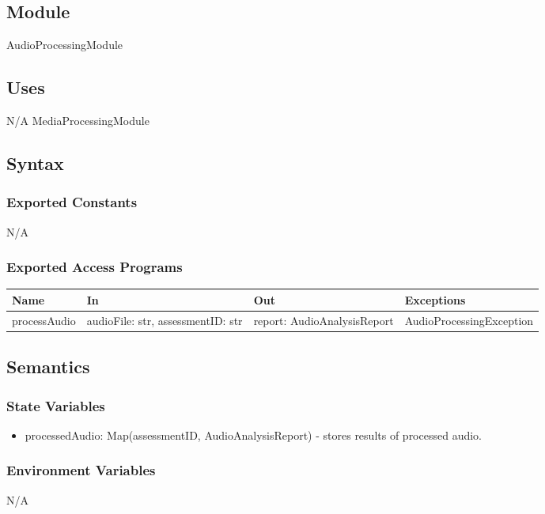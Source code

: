 \documentclass[12pt, titlepage]{article}
\begin{document}
\subsection{Module}
AudioProcessingModule

\subsection{Uses}
N/A
MediaProcessingModule

\subsection{Syntax}

\subsubsection{Exported Constants}
N/A

\subsubsection{Exported Access Programs}

\begin{center}
  \begin{tabular}{p{3cm} p{4cm} p{4cm} p{5cm}}
  \hline
  \textbf{Name} & \textbf{In} & \textbf{Out} & \textbf{Exceptions} \\
  \hline
  processAudio & \raggedright\arraybackslash audioFile: str, assessmentID: str & \raggedright\arraybackslash report: AudioAnalysisReport & \raggedright\arraybackslash AudioProcessingException \\
  \end{tabular}
\end{center}

\subsection{Semantics}

\subsubsection{State Variables}
\begin{itemize}
\item processedAudio: Map(assessmentID, AudioAnalysisReport) - stores results of processed audio.
\end{itemize}

\subsubsection{Environment Variables}
N/A
\end{document}
